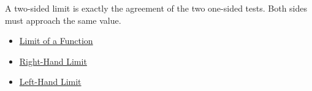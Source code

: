 \begin{remark*}[Interpretation]
A two-sided limit is exactly the agreement of the two one-sided tests.
Both sides must approach the same value.
\end{remark*}

\begin{dependencies}
\begin{itemize}
  \item \hyperref[def:limit-function]{Limit of a Function}
  \item \hyperref[def:right-hand-limit]{Right-Hand Limit}
  \item \hyperref[def:left-hand-limit]{Left-Hand Limit}
\end{itemize}
\end{dependencies}
